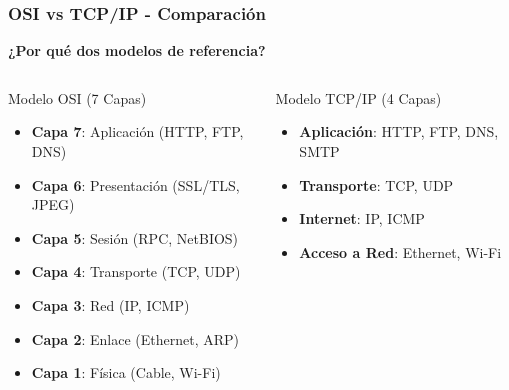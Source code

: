 \documentclass[aspectratio=169]{beamer}
\begin{document}
\begin{frame}
\frametitle{OSI vs TCP/IP - Comparación}

\begin{center}
\Large \textbf{¿Por qué dos modelos de referencia?}
\end{center}

\begin{columns}
\begin{block}{Modelo OSI (7 Capas)}
\begin{itemize}
\item \textbf{Capa 7}: Aplicación (HTTP, FTP, DNS)
\item \textbf{Capa 6}: Presentación (SSL/TLS, JPEG)
\item \textbf{Capa 5}: Sesión (RPC, NetBIOS)
\item \textbf{Capa 4}: Transporte (TCP, UDP)
\item \textbf{Capa 3}: Red (IP, ICMP)
\item \textbf{Capa 2}: Enlace (Ethernet, ARP)
\item \textbf{Capa 1}: Física (Cable, Wi-Fi)
\end{itemize}
\end{block}
      
\begin{block}{Modelo TCP/IP (4 Capas)}
\begin{itemize}
\item \textbf{Aplicación}: HTTP, FTP, DNS, SMTP
\item \textbf{Transporte}: TCP, UDP
\item \textbf{Internet}: IP, ICMP
\item \textbf{Acceso a Red}: Ethernet, Wi-Fi
\end{itemize}
\end{block}
\end{columns}
\end{frame}
\end{document}
